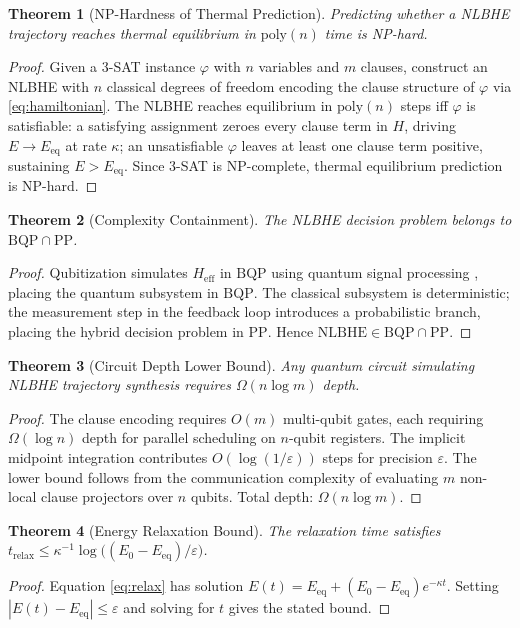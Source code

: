 \documentclass[11pt,letterpaper]{article}
\newtheorem{theorem}{Theorem}[section]
\begin{document}
\begin{theorem}[NP-Hardness of Thermal Prediction]
\label{thm:nphard}
Predicting whether a NLBHE trajectory reaches thermal equilibrium in $\mathrm{poly}(n)$ time
is NP-hard.
\end{theorem}
\begin{proof}
Given a 3-SAT instance $\varphi$ with $n$ variables and $m$ clauses, construct an NLBHE with
$n$ classical degrees of freedom encoding the clause structure of $\varphi$ via
\eqref{eq:hamiltonian}. The NLBHE reaches equilibrium in $\mathrm{poly}(n)$ steps iff
$\varphi$ is satisfiable: a satisfying assignment zeroes every clause term in $H$, driving
$E \to E_{\mathrm{eq}}$ at rate $\kappa$; an unsatisfiable $\varphi$ leaves at least one
clause term positive, sustaining $E > E_{\mathrm{eq}}$. Since 3-SAT is NP-complete, thermal
equilibrium prediction is NP-hard.
\end{proof}

\begin{theorem}[Complexity Containment]
\label{thm:bqp}
The NLBHE decision problem belongs to $\mathrm{BQP} \cap \mathrm{PP}$.
\end{theorem}
\begin{proof}
Qubitization \cite{childs2012} simulates $H_{\mathrm{eff}}$ in $\mathrm{BQP}$ using quantum
signal processing \cite{low2019}, placing the quantum subsystem in $\mathrm{BQP}$. The
classical subsystem is deterministic; the measurement step in the feedback loop introduces a
probabilistic branch, placing the hybrid decision problem in $\mathrm{PP}$. Hence
$\mathrm{NLBHE} \in \mathrm{BQP} \cap \mathrm{PP}$.
\end{proof}

\begin{theorem}[Circuit Depth Lower Bound]
\label{thm:depth}
Any quantum circuit simulating NLBHE trajectory synthesis requires $\Omega(n \log m)$ depth.
\end{theorem}
\begin{proof}
The clause encoding requires $O(m)$ multi-qubit gates, each requiring $\Omega(\log n)$
depth for parallel scheduling on $n$-qubit registers. The implicit midpoint integration
contributes $O(\log(1/\varepsilon))$ steps for precision $\varepsilon$. The lower bound
follows from the communication complexity of evaluating $m$ non-local clause projectors over
$n$ qubits. Total depth: $\Omega(n \log m)$.
\end{proof}

\begin{theorem}[Energy Relaxation Bound]
\label{thm:relax}
The relaxation time satisfies
$t_{\mathrm{relax}} \leq \kappa^{-1}\log\bigl((E_0 - E_{\mathrm{eq}})/\varepsilon\bigr)$.
\end{theorem}
\begin{proof}
Equation \eqref{eq:relax} has solution $E(t) = E_{\mathrm{eq}} + (E_0 - E_{\mathrm{eq}})e^{-\kappa t}$.
Setting $|E(t) - E_{\mathrm{eq}}| \leq \varepsilon$ and solving for $t$ gives the stated bound.
\end{proof}
\end{document}
